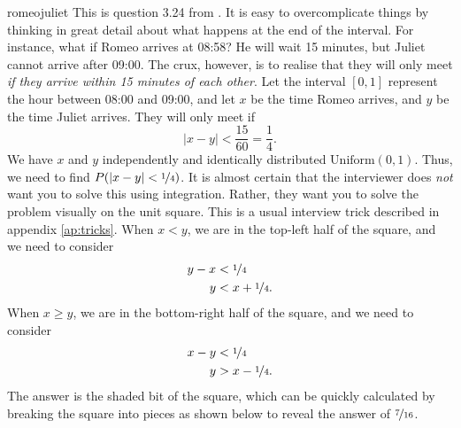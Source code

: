 \begin{answer}{romeojuliet}
This is question 3.24 from \citet{JoshiQA}.
It is easy to overcomplicate things by thinking in great detail about what happens at the end of the interval.
For instance, what if Romeo arrives at 08:58? He will wait 15 minutes, but Juliet cannot arrive after 09:00.
The crux, however, is to realise that they will only meet \emph{if they arrive within 15 minutes of each other}.
Let the interval $[0,1]$ represent the hour between 08:00 and 09:00, and let $x$ be the time Romeo arrives, and $y$ be the time Juliet arrives.
They will only meet if
\[
  |x - y| < \frac{15}{60} = \frac{1}{4}
  \text{.}
\]
We have
$x$ and $y$
independently and identically distributed
$\text{Uniform}(0,1)$.
Thus, we need to find $P(\lvert x - y\rvert < \nicefrac{1}{4})$.
It is almost certain that the interviewer does \emph{not} want you to solve this using integration.
Rather, they want you to solve the problem visually on the unit square.
This is a usual interview trick described in appendix \ref{ap:tricks}.
When $x<y$, we are in the top-left half of the square, and we need to consider
\begin{align*}
  y-x &< \nicefrac{1}{4} \\
  y &< x + \nicefrac{1}{4}
  \text{.}
\end{align*}
When $x \geq y$, we are in the bottom-right half of the square, and we need to consider
\begin{align*}
  x-y &< \nicefrac{1}{4} \\
  y  &> x -\nicefrac{1}{4}
  \text{.}
\end{align*}
The answer is the shaded bit of the square, which can be quickly calculated by breaking the square into pieces as shown below to reveal the answer of $\nicefrac{7}{16}$.
\begin{center}

\end{center}
\end{answer}
